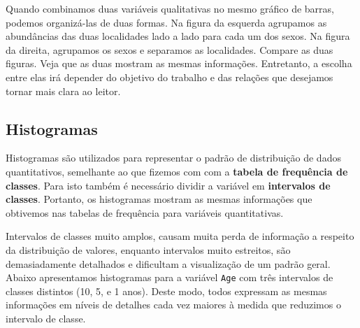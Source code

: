 \documentclass[
]{book}
\begin{document}
Quando combinamos duas variáveis qualitativas no mesmo gráfico de barras, podemos organizá-las de duas formas. Na figura da esquerda agrupamos as abundâncias das duas localidades lado a lado para cada um dos sexos. Na figura da direita, agrupamos os sexos e separamos as localidades. Compare as duas figuras. Veja que as duas mostram as mesmas informações. Entretanto, a escolha entre elas irá depender do objetivo do trabalho e das relações que desejamos tornar mais clara ao leitor.

\hypertarget{histogramas}{%
\subsection{Histogramas}\label{histogramas}}

Histogramas são utilizados para representar o padrão de distribuição de dados quantitativos, semelhante ao que fizemos com com a \textbf{tabela de frequência de classes}. Para isto também é necessário dividir a variável em \textbf{intervalos de classes}. Portanto, os histogramas mostram as mesmas informações que obtivemos nas tabelas de frequência para variáveis quantitativas.

Intervalos de classes muito amplos, causam muita perda de informação a respeito da distribuição de valores, enquanto intervalos muito estreitos, são demasiadamente detalhados e dificultam a visualização de um padrão geral. Abaixo apresentamos histogramas para a variável \texttt{Age} com três intervalos de classes distintos (10, 5, e 1 anos). Deste modo, todos expressam as mesmas informações em níveis de detalhes cada vez maiores à medida que reduzimos o intervalo de classe.
\end{document}
